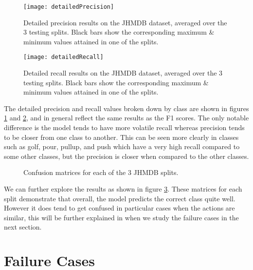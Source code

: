 \begin{figure}[ht]
	\texttt{[image: detailedPrecision]}
	\centering
	\caption{Detailed precision results on the JHMDB dataset, averaged over the 3 testing splits. Black bars show the corresponding maximum \& minimum values attained in one of the splits.}
	\label{fig:detailed-precision}
\end{figure}

\begin{figure}[ht]
	\texttt{[image: detailedRecall]}
	\centering
	\caption{Detailed recall results on the JHMDB dataset, averaged over the 3 testing splits. Black bars show the corresponding maximum \& minimum values attained in one of the splits.}
	\label{fig:detailed-recall}
\end{figure}

The detailed precision and recall values broken down by class are shown in figures \ref{fig:detailed-precision} and \ref{fig:detailed-recall}, and in general reflect the same results as the F1 scores. The only notable difference is the model tends to have more volatile recall whereas precision tends to be closer from one class to another. This can be seen more clearly in classes such as golf, pour, pullup, and push which have a very high recall compared to some other classes, but the precision is closer when compared to the other classes.

\begin{figure}[p]
	\centering
	\caption{Confusion matrices for each of the 3 JHMDB splits.}
	\label{fig:confusion-matrices}
\end{figure}

We can further explore the results as shown in figure \ref{fig:confusion-matrices}. These matrices for each split demonstrate that overall, the model predicts the correct class quite well. However it does tend to get confused in particular cases when the actions are similar, this will be further explained in when we study the failure cases in the next section.

\section{Failure Cases}
\label{sec:failure-cases}

